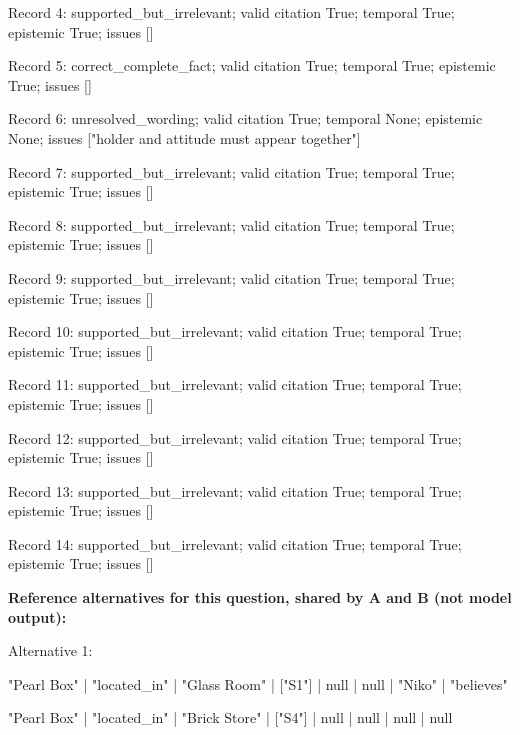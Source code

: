 Record 4: supported\_but\_irrelevant; valid citation True; temporal True; epistemic True; issues []\par

Record 5: correct\_complete\_fact; valid citation True; temporal True; epistemic True; issues []\par

Record 6: unresolved\_wording; valid citation True; temporal None; epistemic None; issues ["holder and attitude must appear together"]\par

Record 7: supported\_but\_irrelevant; valid citation True; temporal True; epistemic True; issues []\par

Record 8: supported\_but\_irrelevant; valid citation True; temporal True; epistemic True; issues []\par

Record 9: supported\_but\_irrelevant; valid citation True; temporal True; epistemic True; issues []\par

Record 10: supported\_but\_irrelevant; valid citation True; temporal True; epistemic True; issues []\par

Record 11: supported\_but\_irrelevant; valid citation True; temporal True; epistemic True; issues []\par

Record 12: supported\_but\_irrelevant; valid citation True; temporal True; epistemic True; issues []\par

Record 13: supported\_but\_irrelevant; valid citation True; temporal True; epistemic True; issues []\par

Record 14: supported\_but\_irrelevant; valid citation True; temporal True; epistemic True; issues []\par

\noindent\textbf{Reference alternatives for this question, shared by A and B (not model output):}

\noindent Alternative 1:

"Pearl Box" | "located\_in" | "Glass Room" | ["S1"] | null | null | "Niko" | "believes"\par\smallskip

"Pearl Box" | "located\_in" | "Brick Store" | ["S4"] | null | null | null | null\par\smallskip

